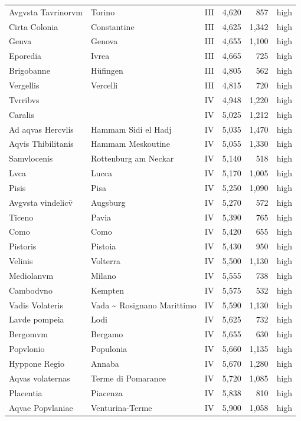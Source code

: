 \documentclass[11pt,a4paper]{article}
\begin{document}
{\begin{longtable}{p{4.6cm}p{5.2cm}lrrl}
Avgvsta Tavrinorvm & Torino & III & 4,620 & 857 & high\\
Cirta Colonia & Constantine & III & 4,625 & 1,342 & high\\
Genva & Genova & III & 4,655 & 1,100 & high\\
Eporedia & Ivrea & III & 4,665 & 725 & high\\
Brigobanne & Hüfingen & III & 4,805 & 562 & high\\
Vergellis & Vercelli & III & 4,815 & 720 & high\\
Tvrribvs &  & IV & 4,948 & 1,220 & high\\
Caralis &  & IV & 5,025 & 1,212 & high\\
Ad aqvas Hercvlis & Hammam Sidi el Hadj & IV & 5,035 & 1,470 & high\\
Aqvis Thibilitanis & Hammam Meskoutine & IV & 5,055 & 1,330 & high\\
Samvlocenis & Rottenburg am Neckar & IV & 5,140 & 518 & high\\
Lvca & Lucca & IV & 5,170 & 1,005 & high\\
Pisis & Pisa & IV & 5,250 & 1,090 & high\\
Avgvsta vindelicv̄ & Augsburg & IV & 5,270 & 572 & high\\
Ticeno & Pavia & IV & 5,390 & 765 & high\\
Como & Como & IV & 5,420 & 655 & high\\
Pistoris & Pistoia & IV & 5,430 & 950 & high\\
Velinis & Volterra & IV & 5,500 & 1,130 & high\\
Mediolanvm & Milano & IV & 5,555 & 738 & high\\
Cambodvno & Kempten & IV & 5,575 & 532 & high\\
Vadis Volateris & Vada \textasciitilde{} Rosignano Marittimo & IV & 5,590 & 1,130 & high\\
Lavde pompeia & Lodi & IV & 5,625 & 732 & high\\
Bergomvm & Bergamo & IV & 5,655 & 630 & high\\
Popvlonio & Populonia & IV & 5,660 & 1,135 & high\\
Hyppone Regio & Annaba & IV & 5,670 & 1,280 & high\\
Aqvas volaternas & Terme di Pomarance & IV & 5,720 & 1,085 & high\\
Placentia & Piacenza & IV & 5,838 & 810 & high\\
Aqvae Popvlaniae & Venturina-Terme & IV & 5,900 & 1,058 & high\\

\end{longtable}}
\end{document}
